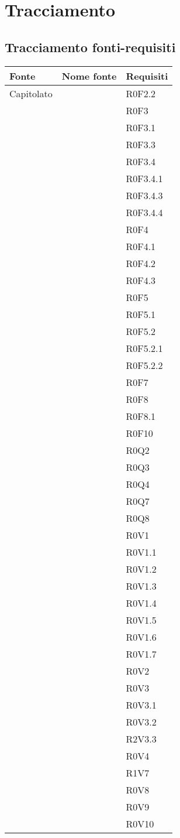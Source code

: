 \documentclass[AnalisiDeiRequisiti.tex]{subfiles}
\begin{document}
\section{Tracciamento}
\subsection{Tracciamento fonti-requisiti}

\label{table:Tabella di tracciamento fonti-requisiti}
\begin{longtable}[H]{|p{2cm}|p{5cm}|p{5cm}|}
	\hline
	\rowcolor[HTML]{38FFF8} 
	\textbf{Fonte} & \textbf{Nome fonte} & \textbf{Requisiti} \\ \hline
	\endhead
	Capitolato & & R0F2.2 \\
	& & R0F3 \\
	& & R0F3.1 \\
	& & R0F3.3 \\
	& & R0F3.4 \\
	& & R0F3.4.1 \\
	& & R0F3.4.3 \\
	& & R0F3.4.4 \\
	& & R0F4 \\
	& & R0F4.1 \\
	& & R0F4.2 \\
	& & R0F4.3 \\
	& & R0F5 \\
	& & R0F5.1 \\
	& & R0F5.2 \\
	& & R0F5.2.1 \\
	& & R0F5.2.2 \\
	& & R0F7 \\
	& & R0F8 \\
	& & R0F8.1 \\
	& & R0F10 \\
	& & R0Q2 \\
	& & R0Q3 \\
	& & R0Q4 \\
	& & R0Q7 \\
	& & R0Q8 \\
	& & R0V1 \\
	& & R0V1.1 \\
	& & R0V1.2 \\
	& & R0V1.3 \\
	& & R0V1.4 \\
	& & R0V1.5 \\
	& & R0V1.6 \\
	& & R0V1.7 \\
	& & R0V2 \\
	& & R0V3 \\
	& & R0V3.1 \\
	& & R0V3.2 \\
	& & R2V3.3 \\
	& & R0V4 \\
	& & R1V7 \\
	& & R0V8 \\
	& & R0V9 \\
	& & R0V10 \\ \hline
	

\end{longtable}
\end{document}
